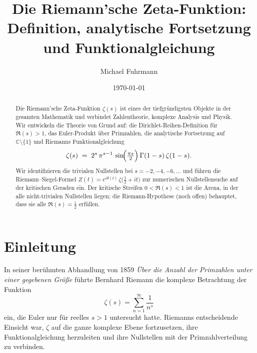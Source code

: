\documentclass[12pt,a4paper]{amsart}
\theoremstyle{definition}
\newcommand{\C}{\mathbb{C}}
\begin{document}

\title{Die Riemann'sche Zeta-Funktion:\\
       Definition, analytische Fortsetzung und Funktionalgleichung}

\author{Michael Fuhrmann}
\address{Specialist Mathematics Project, Build 84}
\date{\today}

\begin{abstract}
Die Riemann'sche Zeta-Funktion $\zeta(s)$ ist eines der tiefgr\"undigsten
Objekte in der gesamten Mathematik und verbindet Zahlentheorie, komplexe
Analysis und Physik.
Wir entwickeln die Theorie von Grund auf:
die Dirichlet-Reihen-Definition f\"ur $\Re(s) > 1$,
das Euler-Produkt \"uber Primzahlen,
die analytische Fortsetzung auf $\C \setminus \{1\}$
und Riemanns Funktionalgleichung
\[
  \zeta(s) \;=\; 2^s\,\pi^{s-1}\,\sin\!\Bigl(\tfrac{\pi s}{2}\Bigr)\,
  \Gamma(1-s)\,\zeta(1-s).
\]
Wir identifizieren die trivialen Nullstellen bei $s = -2, -4, -6, \ldots$
und f\"uhren die Riemann--Siegel-Formel $Z(t) = e^{i\theta(t)}\,\zeta\!\bigl(\tfrac{1}{2}+it\bigr)$
zur numerischen Nullstellensuche auf der kritischen Geraden ein.
Der kritische Streifen $0 < \Re(s) < 1$ ist die Arena, in der alle
nicht-trivialen Nullstellen liegen; die Riemann-Hypothese (noch offen)
behauptet, dass sie alle $\Re(s) = \tfrac{1}{2}$ erf\"ullen.
\end{abstract}

\maketitle
\tableofcontents

\section{Einleitung}

In seiner ber\"uhmten Abhandlung von 1859 \emph{\"Uber die Anzahl der
Primzahlen unter einer gegebenen Gr\"o\ss e} \cite{Riemann1859}
f\"uhrte Bernhard Riemann die komplexe Betrachtung der Funktion
\[
  \zeta(s) = \sum_{n=1}^{\infty} \frac{1}{n^s}
\]
ein, die Euler nur f\"ur reelles $s > 1$ untersucht hatte.
Riemanns entscheidende Einsicht war, $\zeta$ auf die ganze komplexe Ebene
fortzusetzen, ihre Funktionalgleichung herzuleiten und ihre Nullstellen mit
der Primzahlverteilung zu verbinden.
\end{document}
